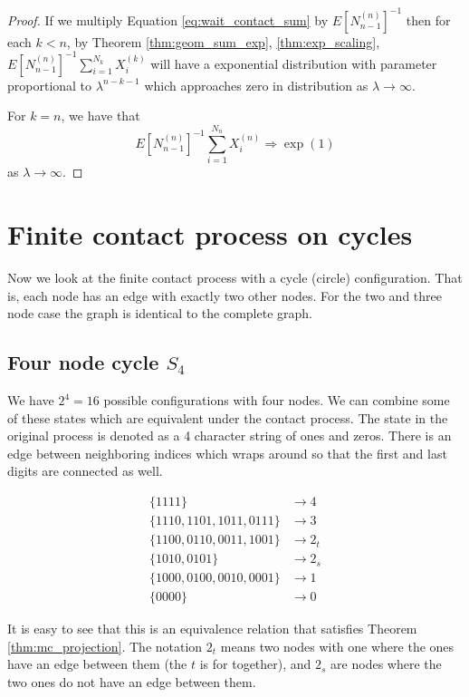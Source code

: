 \documentclass{article}
\theoremstyle{plain}
\theoremstyle{definition}
\theoremstyle{remark}
\numberwithin{equation}{section}
\begin{document}
\begin{proof}
If we multiply Equation \eqref{eq:wait_contact_sum} by $E[N_{n-1}^{(n)}]^{-1}$ then for each $k < n$, by Theorem \eqref{thm:geom_sum_exp}, \eqref{thm:exp_scaling}, $E[N_{n-1}^{(n)}]^{-1} \sum_{i =
1}^{N_{k}} X_i^{(k)}$ will have a exponential distribution with parameter proportional to $\lambda^{n - k - 1}$ which approaches zero in distribution as $\lambda \to \infty$.

For $k = n$, we have that
$$
E[N_{n-1}^{(n)}]^{-1} \sum_{i =
1}^{N_{n}} X_i^{(n)} \Rightarrow \exp(1)
$$
as $\lambda \to \infty$.
\end{proof}

\section{Finite contact process on cycles}

Now we look at the finite contact process with a cycle (circle) configuration.
That is, each node has an edge with exactly two other nodes.
For the two and three node case the graph is identical to the complete graph.

\subsection{Four node cycle \texorpdfstring{$S_4$}{S4}}
We have $2^4 = 16$ possible configurations with four nodes.
We can combine some of these states which are equivalent under the contact process.
The state in the original process is denoted as a 4 character string of ones and zeros.
There is an edge between neighboring indices which wraps around so that the first and last digits are connected as well.

\begin{align*}
    \{1111\} &\to 4\\
    \{1110, 1101, 1011, 0111\} &\to 3\\
    \{1100, 0110, 0011, 1001\} &\to 2_t\\
    \{1010, 0101\} &\to 2_s\\
    \{1000, 0100, 0010, 0001\} &\to 1\\
    \{0000\} &\to 0
\end{align*}

It is easy to see that this is an equivalence relation that satisfies Theorem \ref{thm:mc_projection}.
The notation $2_t$ means two nodes with one where the ones have an edge between them (the $t$ is for together),
and $2_s$ are nodes where the two ones do not have an edge between them.
\end{document}
